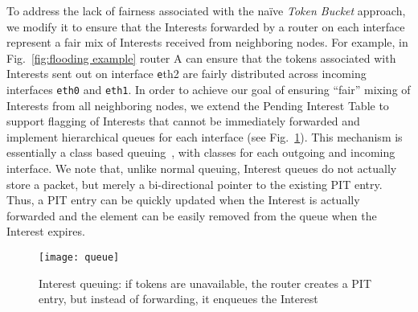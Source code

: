 To address the lack of fairness associated with the na\"ive {\it Token Bucket} approach, we modify it to ensure that the Interests forwarded by a router on each interface represent a fair mix of Interests received from neighboring nodes. For example, in Fig.~\ref{fig:flooding example} router A can ensure that the tokens associated with Interests sent out on interface {\texttt eth2}  are fairly distributed across incoming interfaces \texttt{eth0} and \texttt{eth1}. 
In order to achieve our goal of ensuring ``fair'' mixing of Interests from all neighboring nodes, 
we extend the Pending Interest Table to support flagging of Interests that cannot be immediately forwarded and implement hierarchical queues for each interface (see Fig.~\ref{fig:queueing}). 
This mechanism is essentially a class based queuing~\cite{floyd1995link}, with classes for each outgoing and incoming interface.
We note that, unlike normal queuing, Interest queues do not actually store a packet, but merely a bi-directional pointer to the existing PIT entry.
Thus, a PIT entry can be quickly updated when the Interest is actually forwarded and the element can be easily removed from the queue when the Interest expires.


\begin{figure}[thb]
  \centering
  \texttt{[image: queue]}
  \vspace{-0.7cm}
  \caption{Interest queuing: if tokens are unavailable, the router creates a PIT entry, but instead of forwarding, it enqueues the Interest}
  \label{fig:queueing}
\end{figure}

